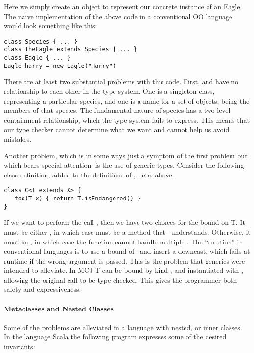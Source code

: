 \documentclass{acm-sigplan}
\begin{document}
Here we simply create an object to represent our concrete instance of
an Eagle.  The naive implementation of the above code in a
conventional OO language would look something like this:

\begin{verbatim}
class Species { ... }
class TheEagle extends Species { ... }
class Eagle { ... }
Eagle harry = new Eagle("Harry")
\end{verbatim}

There are at least two substantial problems with this code.  First,
{} and {} have no relationship to each other in
the type system.  One is a singleton class, representing a particular
species, and one is a name for a set of objects, being the members of
that species.  The fundamental nature of species has a two-level
containment relationship, which the type system fails to express.
This means that our type checker cannot determine what we want and
cannot help us avoid mistakes.

Another problem, which is in some ways just a symptom of the first
problem but which bears special attention, is the use of generic
types.  Consider the following class definition, added to the
definitions of , , etc. above.  

\begin{verbatim}
class C<T extends X> {
   foo(T x) { return T.isEndangered() }
}
\end{verbatim}

If we want to perform the call {}, then we have two
choices for the bound  on {\txt T}.  It must be either \Object,
in which case {} must be a method that \Object\
understands. Otherwise, it must be , in which case the
function cannot handle multiple {\txt{Species}}.  The ``solution'' in
conventional languages is to use a bound of \Object\ and insert a
downcast, which fails at runtime if the wrong argument is passed.
This is the problem that generics were intended to alleviate.  In
MCJ {\txt T} can be bound by kind {\txt{Species}}, and instantiated
with {\txt{Eagle}}, allowing the original call to be type-checked.
This gives the programmer both safety and expressiveness.

\paragraph{Metaclasses and Nested Classes}
Some of the problems are alleviated in a language with nested, or
inner classes.  In the language Scala\cite{Scala} the following
program expresses some of the desired invariants:
\end{document}
